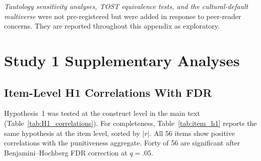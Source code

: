 \textit{Tautology sensitivity analyses, TOST equivalence tests, and the cultural-default multiverse} were not pre-registered but were added in response to peer-reader concerns. They are reported throughout this appendix as exploratory.
\section{Study 1 Supplementary Analyses}
\label{sec:supp_study1}

\subsection{Item-Level H1 Correlations With FDR}
\label{sec:supp_item_H1}

Hypothesis~1 was tested at the construct level in the main text (Table~\ref{tab:H1_correlations}). For completeness, Table~\ref{tab:item_h1} reports the same hypothesis at the item level, sorted by $|r|$. All 56 items show positive correlations with the punitiveness aggregate. Forty of 56 are significant after Benjamini--Hochberg FDR correction at $q = .05$.

